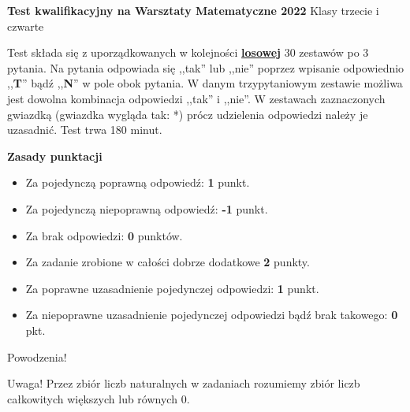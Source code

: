\documentclass[12pt, a4paper]{article}
\begin{document}
	\begin{center}{\large{\hspace{1cm}\textbf{Test kwalifikacyjny na Warsztaty Matematyczne 2022}}}
				\newline \newline Klasy trzecie i czwarte\end{center}
\par
\vspace{0.3cm}
Test składa się z uporządkowanych w kolejności \underline{\textbf{losowej}} 30 zestawów po 3 pytania. Na pytania odpowiada się ,,tak'' lub ,,nie'' poprzez wpisanie odpowiednio ,,\textbf{T}'' bądź ,,\textbf{N}''
w pole obok pytania. W danym trzypytaniowym zestawie możliwa jest dowolna kombinacja
odpowiedzi ,,tak'' i ,,nie''. W zestawach zaznaczonych gwiazdką (gwiazdka wygląda tak: *)
prócz udzielenia odpowiedzi należy je uzasadnić. Test trwa 180 minut.
\vspace{0.5cm}
\par
\textbf{Zasady punktacji}
\begin{itemize}
   \item Za pojedynczą poprawną odpowiedź: \textbf{1} punkt.
   \item Za pojedynczą niepoprawną odpowiedź: \textbf{-1} punkt.
   \item Za brak odpowiedzi: \textbf{0} punktów.
   \item Za zadanie zrobione w całości dobrze dodatkowe \textbf{2} punkty.
   \item Za poprawne uzasadnienie pojedynczej odpowiedzi: \textbf{1} punkt.
   \item Za niepoprawne uzasadnienie pojedynczej odpowiedzi bądź brak takowego: \textbf{0} pkt.
\end{itemize}
	\begin{center}Powodzenia!\end{center}
Uwaga! Przez zbiór liczb naturalnych w zadaniach rozumiemy zbiór liczb całkowitych większych lub równych $0$.
\vspace{0.2cm}

\renewcommand{\labelitemi}{\LARGE{$\square$}}
\newcommand{\normalitem}{\stepcounter{enumi}\item[\textbf{\theenumi. }]}
\newcommand{\asterixitem}{\stepcounter{enumi}\item[\textbf{\theenumi*. }]}
\end{document}
